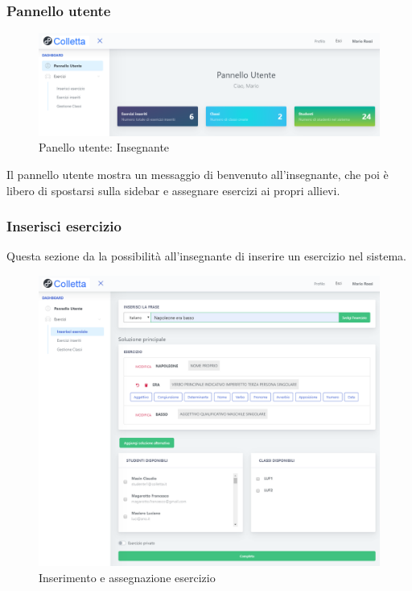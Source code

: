         
        
        \subsubsection{Pannello utente}
        \begin{figure}[H]
        		\centering
        		\includegraphics[width=1\linewidth]{sez/img/insegnante/panelloUtente.PNG} 
        		\caption{Panello utente: Insegnante}\label{fig:1}
    		\end{figure}
          Il pannello utente mostra un messaggio di benvenuto all'insegnante, che poi è libero di spostarsi sulla sidebar e assegnare esercizi ai propri allievi.
        
        \newpage
        \subsubsection{Inserisci esercizio}
          Questa sezione da la possibilità all'insegnante di inserire un esercizio nel sistema.
        	\begin{figure}[H]
            	\centering
        		\includegraphics[width=17cm]{sez/img/insegnante/inserisciEsercizio.PNG} 
            	\caption{Inserimento e assegnazione esercizio}\label{fig:1}
        	\end{figure}
        
